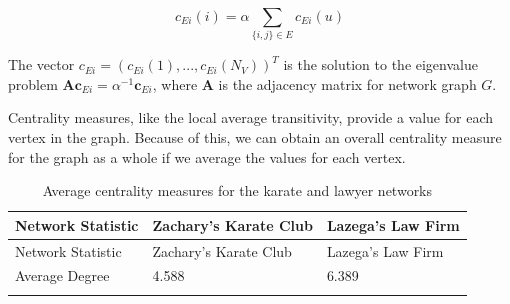 \documentclass[12pt,twoside]{amherstthesis}
\begin{document}
  \[c_{Ei}(i) = \alpha \sum_{\{i,j\} \in E}^{} c_{Ei} (u)\]
  
  The vector \(c_{Ei} = (c_{Ei}(1), ..., c_{Ei}(N_V))^T\) is the solution
  to the eigenvalue problem
  \(\textbf{A}\textbf{c}_{Ei} = \alpha^{-1}\textbf{c}_{Ei}\), where
  \(\textbf{A}\) is the adjacency matrix for network graph \(G\).
  
  Centrality measures, like the local average transitivity, provide a
  value for each vertex in the graph. Because of this, we can obtain an
  overall centrality measure for the graph as a whole if we average the
  values for each vertex.
  
  \begin{longtable}[]{@{}lll@{}}
  \caption{Average centrality measures for the karate and lawyer networks
  \label{tab:avgcent}}\tabularnewline
  \toprule
  \begin{minipage}[b]{0.36\columnwidth}\raggedright\strut
  Network Statistic\strut
  \end{minipage} & \begin{minipage}[b]{0.28\columnwidth}\raggedright\strut
  Zachary's Karate Club\strut
  \end{minipage} & \begin{minipage}[b]{0.28\columnwidth}\raggedright\strut
  Lazega's Law Firm\strut
  \end{minipage}\tabularnewline
  \midrule
  \endfirsthead
  \toprule
  \begin{minipage}[b]{0.36\columnwidth}\raggedright\strut
  Network Statistic\strut
  \end{minipage} & \begin{minipage}[b]{0.28\columnwidth}\raggedright\strut
  Zachary's Karate Club\strut
  \end{minipage} & \begin{minipage}[b]{0.28\columnwidth}\raggedright\strut
  Lazega's Law Firm\strut
  \end{minipage}\tabularnewline
  \midrule
  \endhead
  \begin{minipage}[t]{0.36\columnwidth}\raggedright\strut
  Average Degree\strut
  \end{minipage} & \begin{minipage}[t]{0.28\columnwidth}\raggedright\strut
  4.588\strut
  \end{minipage} & \begin{minipage}[t]{0.28\columnwidth}\raggedright\strut
  6.389\strut
  \end{minipage}\tabularnewline
  \begin{minipage}[t]{0.36\columnwidth}\raggedright\strut

\end{minipage}
\end{longtable}
\end{document}
